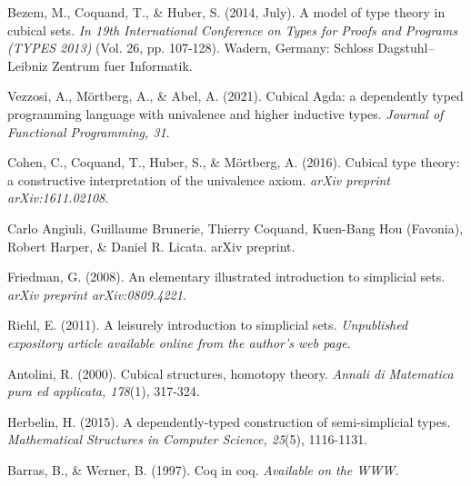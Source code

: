 \documentclass[10pt]{art}
\begin{document}
\newpage
\begin{thebibliography}{10}
  Bezem, M., Coquand, T., \& Huber, S. (2014, July). A model of type theory in cubical sets. \emph{In 19th International Conference on Types for Proofs and Programs (TYPES 2013)} (Vol. 26, pp. 107-128). Wadern, Germany: Schloss Dagstuhl–Leibniz Zentrum fuer Informatik.

  Vezzosi, A., Mörtberg, A., \& Abel, A. (2021). Cubical Agda: a dependently typed programming language with univalence and higher inductive types. \emph{Journal of Functional Programming, 31}.

  Cohen, C., Coquand, T., Huber, S., \& Mörtberg, A. (2016). Cubical type theory: a constructive interpretation of the univalence axiom. \emph{arXiv preprint arXiv:1611.02108}.

  Carlo Angiuli, Guillaume Brunerie, Thierry Coquand, Kuen-Bang Hou (Favonia), Robert Harper, \& Daniel R. Licata. arXiv preprint.

  Friedman, G. (2008). An elementary illustrated introduction to simplicial sets. \emph{arXiv preprint arXiv:0809.4221}.

  Riehl, E. (2011). A leisurely introduction to simplicial sets. \emph{Unpublished expository article available online from the author's web page}.

  Antolini, R. (2000). Cubical structures, homotopy theory. \emph{Annali di Matematica pura ed applicata, 178}(1), 317-324.

  Herbelin, H. (2015). A dependently-typed construction of semi-simplicial types. \emph{Mathematical Structures in Computer Science, 25}(5), 1116-1131.

  Barras, B., \& Werner, B. (1997). Coq in coq. \emph{Available on the WWW.}
\end{thebibliography}
\end{document}
